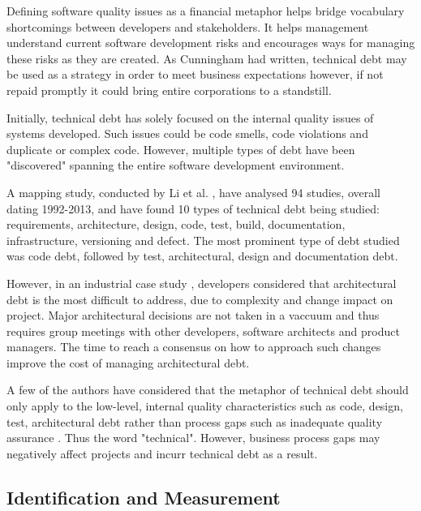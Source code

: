 \documentclass{mprop}
\begin{document}
Defining software quality issues as a financial metaphor helps bridge vocabulary
shortcomings between developers and stakeholders. It helps management understand
current software development risks and encourages ways for managing these risks
as they are created. As Cunningham \cite{Cunningham1993} had written, technical
debt may be used as a strategy in order to meet business expectations however,
if not repaid promptly it could bring entire corporations to a standstill.

Initially, technical debt has solely focused on the internal quality issues of
systems developed. Such issues could be code smells, code violations and
duplicate or complex code. However, multiple types of debt have been
"discovered" spanning the entire software development environment.


A mapping study, conducted by Li et al. \cite{Li2015}, have analysed 94 studies,
overall dating 1992-2013, and have found 10 types of technical debt being
studied: requirements, architecture, design, code, test, build, documentation,
infrastructure, versioning and defect. The most prominent type of debt studied
was code debt, followed by test, architectural, design and documentation debt.

However, in an industrial case study \cite{Codabux2013}, developers considered that
architectural debt is the most difficult to address, due to complexity and change
impact on project. Major architectural decisions are not taken in a vaccuum and
thus requires group meetings with other developers, software architects and
product managers. The time to reach a consensus on how to approach such changes
improve the cost of managing architectural debt.

A few of the authors have considered that the metaphor of technical debt should
only apply to the low-level, internal quality characteristics such as code,
design, test, architectural debt rather than process gaps such as inadequate
quality assurance \cite{Theodoropoulos2011} \cite{Nugroho2011}. Thus the word
"technical". However, business process gaps may negatively affect projects and
incurr technical debt as a result.

\subsection{Identification and Measurement}
\end{document}
